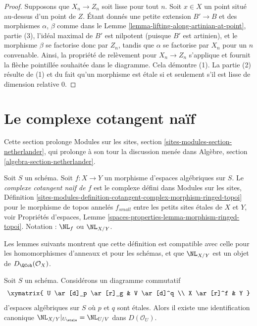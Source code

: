 \begin{proof}
Supposons que $X_n \to Z_n$ soit lisse pour tout $n$.
Soit $x \in X$ un point situé au-dessus d'un point de $Z$.
Étant donnés une petite extension $B' \to B$ et des morphismes $\alpha$, $\beta$ comme dans le
Lemme \ref{lemma-lifting-along-artinian-at-point}, partie (3),
l'idéal maximal de $B'$ est nilpotent (puisque $B'$ est artinien),
et le morphisme $\beta$ se factorise donc par $Z_n$, tandis que $\alpha$ se factorise
par $X_n$ pour un $n$ convenable. Ainsi, la propriété de relèvement pour
$X_n \to Z_n$ s'applique et fournit la flèche pointillée souhaitée dans le diagramme.
Cela démontre (1). La partie (2) résulte de (1) et du fait qu'un morphisme
est étale si et seulement s'il est lisse de dimension relative $0$.
\end{proof}











\section{Le complexe cotangent naïf}
\label{section-netherlander}

\noindent
Cette section prolonge
Modules sur les sites, section \ref{sites-modules-section-netherlander},
qui prolonge à son tour la discussion menée dans
Algèbre, section \ref{algebra-section-netherlander}.

\begin{definition}
\label{definition-netherlander}
Soit $S$ un schéma.
Soit $f : X \to Y$ un morphisme d'espaces algébriques sur $S$.
Le {\it complexe cotangent naïf de $f$}
est le complexe défini dans Modules sur les sites, Définition
\ref{sites-modules-definition-cotangent-complex-morphism-ringed-topoi}
pour le morphisme de topos annelés $f_{small}$ entre les
petits sites étales de $X$ et $Y$, voir
Propriétés d'espaces, Lemme
\ref{spaces-properties-lemma-morphism-ringed-topoi}.
Notation : $\NL_f$ ou $\NL_{X/Y}$.
\end{definition}

\noindent
Les lemmes suivants montrent que cette définition est compatible avec celle
pour les homomorphismes d'anneaux et pour les schémas, et que $\NL_{X/Y}$ est un
objet de $D_\QCoh(\mathcal{O}_X)$.

\begin{lemma}
\label{lemma-NL-etale-localization}
Soit $S$ un schéma. Considérons un diagramme commutatif
$$
\xymatrix{
U \ar[d]_p \ar[r]_g & V \ar[d]^q \\
X \ar[r]^f & Y
}
$$
d'espaces algébriques sur $S$ où $p$ et $q$ sont étales.
Alors il existe une identification canonique
$\NL_{X/Y}|_{U_\etale} = \NL_{U/V}$ dans $D(\mathcal{O}_U)$.
\end{lemma}

